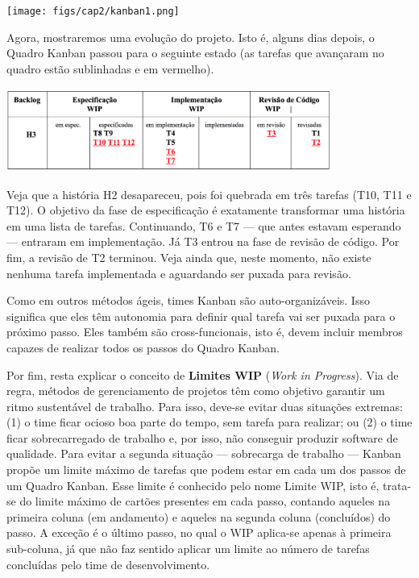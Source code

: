\documentclass[
  11pt,
  twoside]{book}
\begin{document}
\texttt{[image: figs/cap2/kanban1.png]}

Agora, mostraremos uma evolução do projeto. Isto é, alguns dias depois,
o Quadro Kanban passou para o seguinte estado (as tarefas que avançaram
no quadro estão sublinhadas e em vermelho).

\includegraphics[width=0.8\textwidth,height=\textheight]{figs/cap2/kanban2-sublinhado.png}

Veja que a história H2 desapareceu, pois foi quebrada em três tarefas
(T10, T11 e T12). O objetivo da fase de especificação é exatamente
transformar uma história em uma lista de tarefas. Continuando, T6 e T7
--- que antes estavam esperando --- entraram em implementação. Já T3
entrou na fase de revisão de código. Por fim, a revisão de T2 terminou.
Veja ainda que, neste momento, não existe nenhuma tarefa implementada e
aguardando ser puxada para revisão.

Como em outros métodos ágeis, times Kanban são auto-organizáveis. Isso
significa que eles têm autonomia para definir qual tarefa vai ser puxada
para o próximo passo. Eles também são cross-funcionais, isto é, devem
incluir membros capazes de realizar todos os passos do Quadro Kanban.

 
  Por
fim, resta explicar o conceito de \textbf{Limites WIP} (\emph{Work in
Progress}). Via de regra, métodos de gerenciamento de projetos têm como
objetivo garantir um ritmo sustentável de trabalho. Para isso, deve-se
evitar duas situações extremas: (1) o time ficar ocioso boa parte do
tempo, sem tarefa para realizar; ou (2) o time ficar sobrecarregado de
trabalho e, por isso, não conseguir produzir software de qualidade. Para
evitar a segunda situação --- sobrecarga de trabalho --- Kanban propõe
um limite máximo de tarefas que podem estar em cada um dos passos de um
Quadro Kanban. Esse limite é conhecido pelo nome Limite WIP, isto é,
trata-se do limite máximo de cartões presentes em cada passo, contando
aqueles na primeira coluna (em andamento) e aqueles na segunda coluna
(concluídos) do passo. A exceção é o último passo, no qual o WIP
aplica-se apenas à primeira sub-coluna, já que não faz sentido aplicar
um limite ao número de tarefas concluídas pelo time de desenvolvimento.
\end{document}
